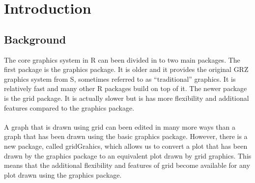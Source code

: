 \documentclass[a4paper,10pt]{article}
\begin{document}


\section{Introduction}
\subsection{Background}
The core graphics system in R can been divided in to two main packages. The first package is the graphics package. It is older and it provides the original GRZ graphics system from S, sometimes referred to as ``traditional'' graphics. It is relatively fast and many other R packages build on top of it. The newer package is the grid package. It is actually slower but is has more flexibility and additional features compared to the graphics package. \\\\
A graph that is drawn using grid can been edited in many more ways than a graph that has been drawn using the basic graphics package. However, there is a new package, called gridGrahics, which allows us to convert a plot that has been drawn by the graphics package to an equivalent plot drawn by grid graphics. This means that the additional flexibility and features of grid become available for any plot drawn using the graphics package. \\\\
\end{document}
